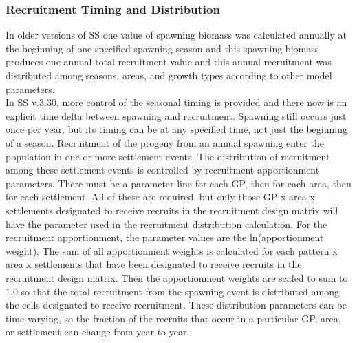 \subsubsection{Recruitment Timing and Distribution}
In older versions of SS one value of spawning biomass was calculated annually at the beginning of one specified spawning season and this spawning biomass produces one annual total recruitment value and this annual recruitment was distributed among seasons, areas, and growth types according to other model parameters.\\ 

In SS v.3.30, more control of the seasonal timing is provided and there now is an explicit time delta between spawning and recruitment. Spawning still occurs just once per year, but its timing can be at any specified time, not just the beginning of a season.  Recruitment of the progeny from an annual spawning enter the population in one or more settlement events.  The distribution of recruitment among these settlement events is controlled by recruitment apportionment parameters. There must be a parameter line for each GP, then for each area, then for each settlement.  All of these are required, but only those GP x area x settlements designated to receive recruits in the recruitment design matrix will have the parameter used in the recruitment distribution calculation.  For the recruitment apportionment, the parameter values are the ln(apportionment weight).  The sum of all apportionment weights is calculated for each pattern x area x settlements that have been designated to receive recruits in the recruitment design matrix.  Then the apportionment weights are scaled to sum to 1.0 so that the total recruitment from the spawning event is distributed among the cells designated to receive recruitment. These distribution parameters can be time-varying, so the fraction of the recruits that occur in a particular GP, area, or settlement can change from year to year. 
